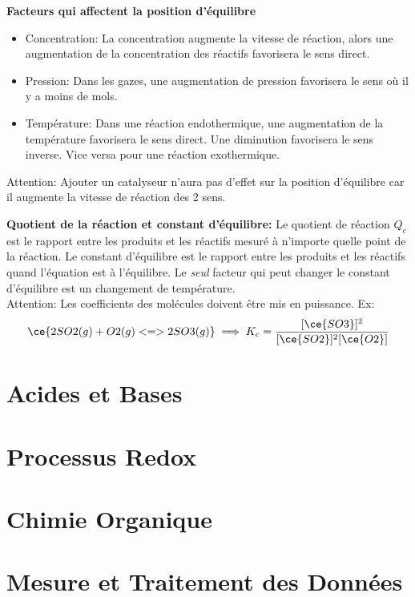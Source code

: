 \documentclass[french, a4paper, 12pt]{article}
\begin{document}
\vspace{0.5em}
\textbf{Facteurs qui affectent la position d'équilibre}
\begin{itemize}
\item Concentration: La concentration augmente la vitesse de réaction, alors une augmentation de la concentration des réactifs favorisera le sens direct.
\item Pression: Dans les gazes, une augmentation de pression favorisera le sens où il y a moins de mols.
\item Température: Dans une réaction endothermique, une augmentation de la température favorisera le sens direct. Une diminution favorisera le sens inverse. Vice versa pour une réaction exothermique.
\end{itemize}
Attention: Ajouter un catalyseur n'aura pas d'effet sur la position d'équilibre car il augmente la vitesse de réaction des 2 sens.

\vspace{0.5em}
\textbf{Quotient de la réaction et constant d'équilibre:}
Le quotient de réaction $Q_c$ est le rapport entre les produits et les réactifs mesuré à n'importe quelle point de la réaction. Le constant d'équilibre est le rapport entre les produits et les réactifs quand l'équation est à l'équilibre. Le \emph{seul} facteur qui peut changer le constant d'équilibre est un changement de température.\\
Attention: Les coefficients des molécules doivent être mis en puissance. Ex:
\[
\ce{2SO2(g) + O2(g) <=> 2SO3(g)} \implies K_c = \frac{[\ce{SO3}]^2}{[\ce{SO2}]^2[\ce{O2}]}
\]
\pagebreak

\section{Acides et Bases}
\pagebreak

\section{Processus Redox}
\pagebreak

\section{Chimie Organique}
\pagebreak

\section{Mesure et Traitement des Données}
\pagebreak
\end{document}
